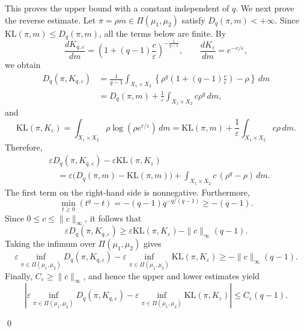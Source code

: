 \documentclass[a4paper,11pt]{article}
\theoremstyle{plain}
\theoremstyle{definition}
\theoremstyle{remark}
\theoremstyle{plain}
\newenvironment{pf}[1]
{{\noindent\textbf{Proof of #1.}}}{\hfill \qed}
\numberwithin{equation}{section}
\newcommand{\ep}{\varepsilon}
\newcommand{\1}{\mbox{1}\hspace{-0.25em}\mbox{l}} %
\begin{document}
\begin{pf}{Theorem \ref{thm;3}}
This proves the upper bound with a constant independent of $q$. We next prove the reverse estimate. Let $\pi=\rho m\in\Pi(\mu_1,\mu_2)$ satisfy $D_q(\pi,m)<+\infty$. Since $\mathrm{KL}(\pi,m)\leq D_q(\pi,m)$, all the terms below are finite. By
\begin{equation*}
\frac{dK_{q,\ep}}{dm}=\left(1+(q-1)\frac{c}{\ep}\right)^{-\frac{1}{q-1}}, \qquad \frac{dK_\ep}{dm}=e^{-c/\ep},
\end{equation*}
we obtain
\begin{align*}
D_q(\pi,K_{q,\ep})
&=\frac{1}{q-1}\int_{X_1\times X_2}
\left\{\rho^q\left(1+(q-1)\frac{c}{\ep}\right)-\rho\right\}\,dm \\
&=D_q(\pi,m)+\frac{1}{\ep}\int_{X_1\times X_2}c\rho^q\,dm,
\end{align*}
and
\begin{equation*}
\mathrm{KL}(\pi,K_\ep)=\int_{X_1\times X_2}\rho\log\left(\rho e^{c/\ep}\right)\,dm=\mathrm{KL}(\pi,m)+\frac{1}{\ep}\int_{X_1\times X_2}c\rho\,dm.
\end{equation*}
Therefore,
\begin{equation*}
\begin{split}
&\ep D_q(\pi,K_{q,\ep})-\ep\mathrm{KL}(\pi,K_\ep) \\
&\quad=\ep\bigl(D_q(\pi,m)-\mathrm{KL}(\pi,m)\bigr)+\int_{X_1\times X_2}c\,(\rho^q-\rho)\,dm.
\end{split}
\end{equation*}
The first term on the right-hand side is nonnegative. Furthermore,
\begin{equation*}
\min_{t\geq0}(t^q-t) =-(q-1)q^{-q/(q-1)}\geq-(q-1).
\end{equation*}
Since $0\leq c\leq\|c\|_\infty$, it follows that
\begin{equation*}
\ep D_q(\pi,K_{q,\ep}) \geq\ep\mathrm{KL}(\pi,K_\ep)-\|c\|_\infty(q-1).
\end{equation*}
Taking the infimum over $\Pi(\mu_1,\mu_2)$ gives
\begin{equation*}
\ep\inf_{\pi\in\Pi(\mu_1,\mu_2)}D_q(\pi,K_{q,\ep}) -\ep\inf_{\pi\in\Pi(\mu_1,\mu_2)}\mathrm{KL}(\pi,K_\ep) \geq-\|c\|_\infty(q-1).
\end{equation*}
Finally, $C_\ep\geq\|c\|_\infty$, and hence the upper and lower estimates yield
\begin{equation*}
\left| \ep\inf_{\pi\in\Pi(\mu_1,\mu_2)}D_q(\pi,K_{q,\ep}) -\ep\inf_{\pi\in\Pi(\mu_1,\mu_2)}\mathrm{KL}(\pi,K_\ep) \right|\leq C_\ep(q-1).
\end{equation*}

\end{pf}
\end{document}
